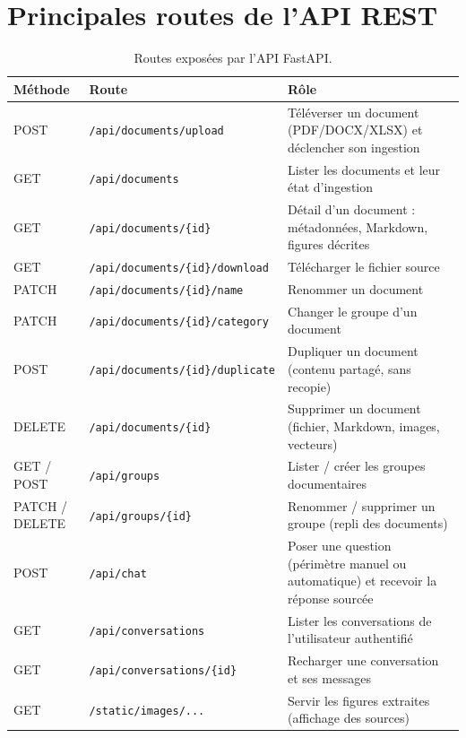 \appendix
\cleardoublepage
\chapter{Principales routes de l'API REST}
\label{annexe:api}

\begin{table}[!htb]
\centering\small
\caption{Routes exposées par l'API FastAPI.}
\label{tab:api}
\begin{tabularx}{\textwidth}{@{}llX@{}}
\toprule
\textbf{Méthode} & \textbf{Route} & \textbf{Rôle} \\
\midrule
POST & \texttt{/api/documents/upload} & Téléverser un document (PDF/DOCX/XLSX) et déclencher son ingestion \\
GET & \texttt{/api/documents} & Lister les documents et leur état d'ingestion \\
GET & \texttt{/api/documents/\{id\}} & Détail d'un document : métadonnées, Markdown, figures décrites \\
GET & \texttt{/api/documents/\{id\}/download} & Télécharger le fichier source \\
PATCH & \texttt{/api/documents/\{id\}/name} & Renommer un document \\
PATCH & \texttt{/api/documents/\{id\}/category} & Changer le groupe d'un document \\
POST & \texttt{/api/documents/\{id\}/duplicate} & Dupliquer un document (contenu partagé, sans recopie) \\
DELETE & \texttt{/api/documents/\{id\}} & Supprimer un document (fichier, Markdown, images, vecteurs) \\
GET / POST & \texttt{/api/groups} & Lister / créer les groupes documentaires \\
PATCH / DELETE & \texttt{/api/groups/\{id\}} & Renommer / supprimer un groupe (repli des documents) \\
POST & \texttt{/api/chat} & Poser une question (périmètre manuel ou automatique) et recevoir la réponse sourcée \\
GET & \texttt{/api/conversations} & Lister les conversations de l'utilisateur authentifié \\
GET & \texttt{/api/conversations/\{id\}} & Recharger une conversation et ses messages \\
GET & \texttt{/static/images/...} & Servir les figures extraites (affichage des sources) \\
\bottomrule
\end{tabularx}
\end{table}
